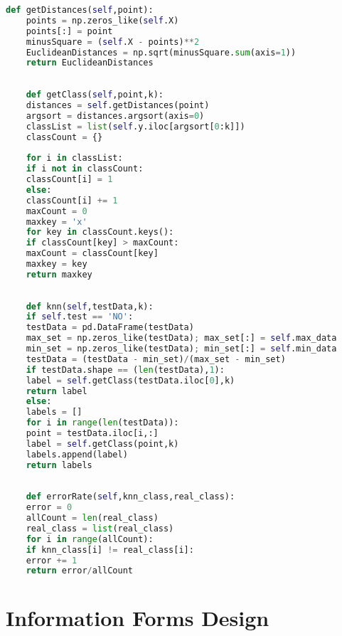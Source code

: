 \begin{appendices}
\begin{lstlisting}[language=python]
    def getDistances(self,point):  
    points = np.zeros_like(self.X)   
    points[:] = point                
    minusSquare = (self.X - points)**2  
    EuclideanDistances = np.sqrt(minusSquare.sum(axis=1)) 
    return EuclideanDistances
    
    
    def getClass(self,point,k):    
    distances = self.getDistances(point)
    argsort = distances.argsort(axis=0)       
    classList = list(self.y.iloc[argsort[0:k]])
    classCount = {}
  
    for i in classList:
    if i not in classCount:
    classCount[i] = 1
    else:
    classCount[i] += 1
    maxCount = 0
    maxkey = 'x'
    for key in classCount.keys():
    if classCount[key] > maxCount:
    maxCount = classCount[key]
    maxkey = key
    return maxkey
    
    
    def knn(self,testData,k):     
    if self.test == 'NO':    
    testData = pd.DataFrame(testData)
    max_set = np.zeros_like(testData); max_set[:] = self.max_data
    min_set = np.zeros_like(testData); min_set[:] = self.min_data
    testData = (testData - min_set)/(max_set - min_set)   
    if testData.shape == (len(testData),1): 
    label = self.getClass(testData.iloc[0],k)
    return label                      
    else:
    labels = []
    for i in range(len(testData)):
    point = testData.iloc[i,:]
    label = self.getClass(point,k)
    labels.append(label)
    return labels                    
    
    
    def errorRate(self,knn_class,real_class):   
    error = 0
    allCount = len(real_class)
    real_class = list(real_class)
    for i in range(allCount):
    if knn_class[i] != real_class[i]:
    error += 1
    return error/allCount
    \end{lstlisting}

	\section{Information Forms Design \label{ap2}}
		

\end{appendices}
